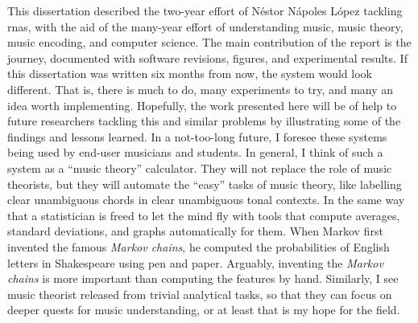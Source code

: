 
This dissertation described the two-year effort of N\'estor
N\'apoles L\'opez tackling \glspl{rna}, with the aid of the
many-year effort of understanding music, music theory, music
encoding, and computer science. The main contribution of the
report is the journey, documented with software revisions,
figures, and experimental results. If this dissertation was
written six months from now, the system would look
different. That is, there is much to do, many experiments to
try, and many an idea worth implementing. Hopefully, the
work presented here will be of help to future researchers
tackling this and similar problems by illustrating some of
the findings and lessons learned. In a not-too-long future,
I foresee these systems being used by end-user musicians and
students. In general, I think of such a system as a ``music
theory'' calculator. They will not replace the role of music
theorists, but they will automate the ``easy'' tasks of
music theory, like labelling clear unambiguous chords in
clear unambiguous tonal contexts. In the same way that a
statistician is freed to let the mind fly with tools that
compute averages, standard deviations, and graphs
automatically for them. When Markov first invented the
famous \emph{Markov chains}, he computed the probabilities
of English letters in Shakespeare using pen and paper.
Arguably, inventing the \emph{Markov chains} is more
important than computing the features by hand. Similarly, I
see  music theorist released from trivial analytical tasks,
so that they can focus on deeper quests for music
understanding, or at least that is my hope for the field. 
